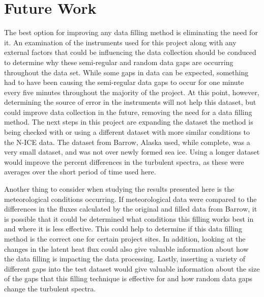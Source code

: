  \section{Future Work}
The best option for improving any data filling method is eliminating the need for it. An examination of the instruments used for this project along with any external factors that could be influencing the data collection should be conduced to determine why these semi-regular and random data gaps are occurring throughout the data set. While some gaps in data can be expected, something had to have been causing the semi-regular data gaps to occur for one minute every five minutes throughout the majority of the project. At this point, however, determining the source of error in the instruments will not help this dataset, but could improve data collection in the future, removing the need for a data filling method.
The next steps in this project are expanding the dataset the method is being checked with or using a different dataset with more similar conditions to the N-ICE data. The dataset from Barrow, Alaska used, while complete, was a very small dataset, and was not over newly formed sea ice. Using a longer dataset would improve the percent differences in the turbulent spectra, as these were averages over the short period of time used here. 





Another thing to consider when studying the results presented here is the meteorological conditions occurring. If meteorological data were compared to the differences in the fluxes calculated by the original and filled data from Barrow, it is possible that it could be determined what conditions this filling works best in and where it is less effective. This could help to determine if this data filling method is the correct one for certain project sites. In addition, looking at the changes in the latent heat flux could also give valuable information about how the data filling is impacting the data processing. Lastly, inserting a variety of different gaps into the test dataset would give valuable information about the size of the gaps that this filling technique is effective for and how random data gaps change the turbulent spectra. 

